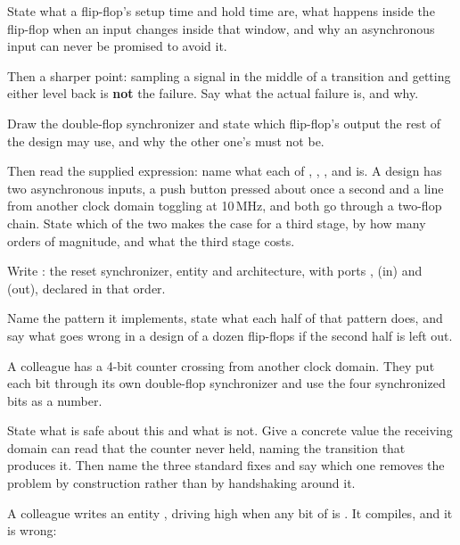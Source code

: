 \label{exa:q:4}

 State what a flip-flop's setup time and hold time are, what happens inside the flip-flop
when an input changes inside that window, and why an asynchronous input can never be promised to
avoid it.

Then a sharper point: sampling a signal in the middle of a transition and getting either level back
is \textbf{not} the failure. Say what the actual failure is, and why. 

 Draw the double-flop synchronizer and state which flip-flop's output the rest of the
design may use, and why the other one's must not be.

Then read the supplied  expression: name what each of , ,
,  and  is. A design has two asynchronous inputs, a push
button pressed about once a second and a line from another clock domain toggling at 10\,MHz, and
both go through a two-flop chain. State which of the two makes the case for a third stage, by how
many orders of magnitude, and what the third stage costs. 

 Write : the reset synchronizer, entity and architecture, with ports
,  (in) and  (out), declared in that order.

Name the pattern it implements, state what each half of that pattern does, and say what goes wrong
in a design of a dozen flip-flops if the second half is left out. 

 A colleague has a 4-bit counter crossing from another clock domain. They put each bit
through its own double-flop synchronizer and use the four synchronized bits as a number.

State what is safe about this and what is not. Give a concrete value the receiving domain can read
that the counter never held, naming the transition that produces it. Then name the three standard
fixes and say which one removes the problem by construction rather than by handshaking around it.

\label{exa:q:5}

 A colleague writes an entity , driving  high when any bit of
 is . It compiles, and it is wrong:

